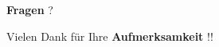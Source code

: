%

\begin{frame}[focus]
	\textbf{Fragen} ?
\end{frame}

\begin{frame}[focus]
	Vielen Dank für Ihre \textbf{Aufmerksamkeit} !!
\end{frame}